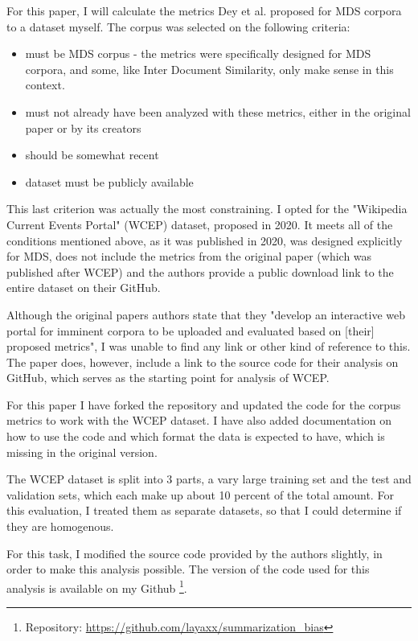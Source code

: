 \documentclass[../main.tex]{subfiles}
\begin{document}
For this paper, I will calculate the metrics Dey et al. proposed for MDS corpora to a dataset myself.
The corpus was selected on the following criteria:

\begin{itemize}
    \item must be MDS corpus - the metrics were specifically designed for MDS corpora, and some, like Inter Document Similarity, only make sense in this context.
    \item must not already have been analyzed with these metrics, either in the original paper or by its creators
    \item should be somewhat recent
    \item dataset must be publicly available
\end{itemize}

This last criterion was actually the most constraining. I opted for the "Wikipedia Current Events Portal" (WCEP) dataset, proposed in 2020. \cite{WCEP-gholipour-ghalandari-etal-2020-large}
It meets all of the conditions mentioned above, as it was published in 2020, was designed explicitly for MDS, does not include the metrics from the original paper (which was published after WCEP) and the authors provide a public download link to the entire dataset on their GitHub.\cite{WCEP-Github-complementizer_2022}


Although the original papers authors state that they "develop an interactive web portal for imminent corpora to be uploaded and evaluated based
on [their] proposed metrics", I was unable to find any link or other kind of reference to this.
The paper does, however, include a link to the source code for their analysis on GitHub, which serves as the starting point for analysis of WCEP.

For this paper I have forked the repository and updated the code for the corpus metrics to work with the WCEP dataset.
I have also added documentation on how to use the code and which format the data is expected to have, which is missing in the original version.


The WCEP dataset is split into 3 parts, a vary large training set and the test and validation sets, which each make up about 10 percent of the total amount.
For this evaluation, I treated them as separate datasets, so that I could determine if they are homogenous.

For this task, I modified the source code provided by the authors slightly, in order to make this analysis possible. The version of the code used for this analysis is available on my Github \footnote{Repository: \url{https://github.com/layaxx/summarization_bias}}.
\end{document}
